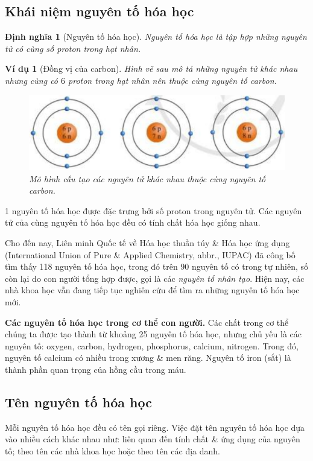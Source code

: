 \documentclass{article}
\newtheorem{dinhnghia}{Định nghĩa}
\newtheorem{vidu}{Ví dụ}
\begin{document}
\subsection{Khái niệm nguyên tố hóa học}

\begin{dinhnghia}[Nguyên tố hóa học]
	\emph{Nguyên tố hóa học} là tập hợp những nguyên tử có cùng số proton trong hạt nhân.
\end{dinhnghia}

\begin{vidu}[Đồng vị của carbon]
	Hình vẽ sau mô tả những nguyên tử khác nhau nhưng cùng có $6$ proton trong hạt nhân nên thuộc cùng nguyên tố carbon.
	\begin{figure}[H]
		\centering
		\includegraphics[scale=0.4]{carbon}
		\caption{Mô hình cấu tạo các nguyên tử khác nhau thuộc cùng nguyên tố carbon.}
	\end{figure}
\end{vidu}
1 nguyên tố hóa học được đặc trưng bởi số proton trong nguyên tử. Các nguyên tử của cùng nguyên tố hóa học đều có tính chất hóa học giống nhau.

Cho đến nay, Liên minh Quốc tế về Hóa học thuần túy \& Hóa học ứng dụng (International Union of Pure \& Applied Chemistry, abbr., IUPAC) đã công bố tìm thấy 118 nguyên tố hóa học, trong đó trên 90 nguyên tố có trong tự nhiên, số còn lại do con người tổng hợp được, gọi là các \textit{nguyên tố nhân tạo}. Hiện nay, các nhà khoa học vẫn đang tiếp tục nghiên cứu để tìm ra những nguyên tố hóa học mới.

\textbf{Các nguyên tố hóa học trong cơ thể con người.} Các chất trong cơ thể chúng ta được tạo thành từ khoảng 25 nguyên tố hóa học, nhưng chủ yếu là các nguyên tố: oxygen, carbon, hydrogen, phosphorus, calcium, nitrogen. Trong đó, nguyên tố calcium có nhiều trong xương \& men răng. Nguyên tố iron (sắt) là thành phần quan trọng của hồng cầu trong máu.

\subsection{Tên nguyên tố hóa học}
Mỗi nguyên tố hóa học đều có tên gọi riêng. Việc đặt tên nguyên tố hóa học dựa vào nhiều cách khác nhau như: liên quan đến tính chất \& ứng dụng của nguyên tố; theo tên các nhà khoa học hoặc theo tên các địa danh.
\end{document}
